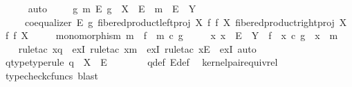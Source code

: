 \begin{isabellebody}
\ \ \ \ \isamarkupfalse%
\ auto\isanewline
\ \ \isamarkupfalse%
\ {\isachardoublequoteopen}{\isasymexists}\ g\ m\ E{\isachardot}{\kern0pt}\ g\ {\isacharcolon}{\kern0pt}\ X\ {\isasymrightarrow}\ E\ {\isasymand}\ m\ {\isacharcolon}{\kern0pt}\ E\ {\isasymrightarrow}\ Y\ \isanewline
\ \ \ \ {\isasymand}\ coequalizer\ E\ g\ {\isacharparenleft}{\kern0pt}fibered{\isacharunderscore}{\kern0pt}product{\isacharunderscore}{\kern0pt}left{\isacharunderscore}{\kern0pt}proj\ X\ f\ f\ X{\isacharparenright}{\kern0pt}\ {\isacharparenleft}{\kern0pt}fibered{\isacharunderscore}{\kern0pt}product{\isacharunderscore}{\kern0pt}right{\isacharunderscore}{\kern0pt}proj\ X\ f\ f\ X{\isacharparenright}{\kern0pt}\isanewline
\ \ \ \ {\isasymand}\ monomorphism\ m\ {\isasymand}\ f\ {\isacharequal}{\kern0pt}\ m\ {\isasymcirc}\isactrlsub c\ g\isanewline
\ \ \ \ {\isasymand}\ {\isacharparenleft}{\kern0pt}{\isasymforall}x{\isachardot}{\kern0pt}\ x\ {\isacharcolon}{\kern0pt}\ E\ {\isasymrightarrow}\ Y\ {\isasymlongrightarrow}\ f\ {\isacharequal}{\kern0pt}\ x\ {\isasymcirc}\isactrlsub c\ g\ {\isasymlongrightarrow}\ x\ {\isacharequal}{\kern0pt}\ m{\isacharparenright}{\kern0pt}{\isachardoublequoteclose}\isanewline
\ \ \isamarkupfalse%
\ {\isacharparenleft}{\kern0pt}rule{\isacharunderscore}{\kern0pt}tac\ x{\isacharequal}{\kern0pt}{\isachardoublequoteopen}q{\isachardoublequoteclose}\ \ exI{\isacharcomma}{\kern0pt}\ rule{\isacharunderscore}{\kern0pt}tac\ x{\isacharequal}{\kern0pt}{\isachardoublequoteopen}m{\isachardoublequoteclose}\ \ exI{\isacharcomma}{\kern0pt}\ rule{\isacharunderscore}{\kern0pt}tac\ x{\isacharequal}{\kern0pt}{\isachardoublequoteopen}E{\isachardoublequoteclose}\ \ exI{\isacharcomma}{\kern0pt}\ auto{\isacharparenright}{\kern0pt}\isanewline
\ \ \ \ \isamarkupfalse%
\ q{\isacharunderscore}{\kern0pt}type{\isacharbrackleft}{\kern0pt}type{\isacharunderscore}{\kern0pt}rule{\isacharbrackright}{\kern0pt}{\isacharcolon}{\kern0pt}\ {\isachardoublequoteopen}q\ {\isacharcolon}{\kern0pt}\ X\ {\isasymrightarrow}\ E{\isachardoublequoteclose}\isanewline
\ \ \ \ \ \ \isamarkupfalse%
\ q{\isacharunderscore}{\kern0pt}def\ E{\isacharunderscore}{\kern0pt}def\ \isamarkupfalse%
\ kernel{\isacharunderscore}{\kern0pt}pair{\isacharunderscore}{\kern0pt}equiv{\isacharunderscore}{\kern0pt}rel\ \isamarkupfalse%
\ {\isacharparenleft}{\kern0pt}typecheck{\isacharunderscore}{\kern0pt}cfuncs{\isacharcomma}{\kern0pt}\ blast{\isacharparenright}{\kern0pt}\isanewline

\end{isabellebody}
